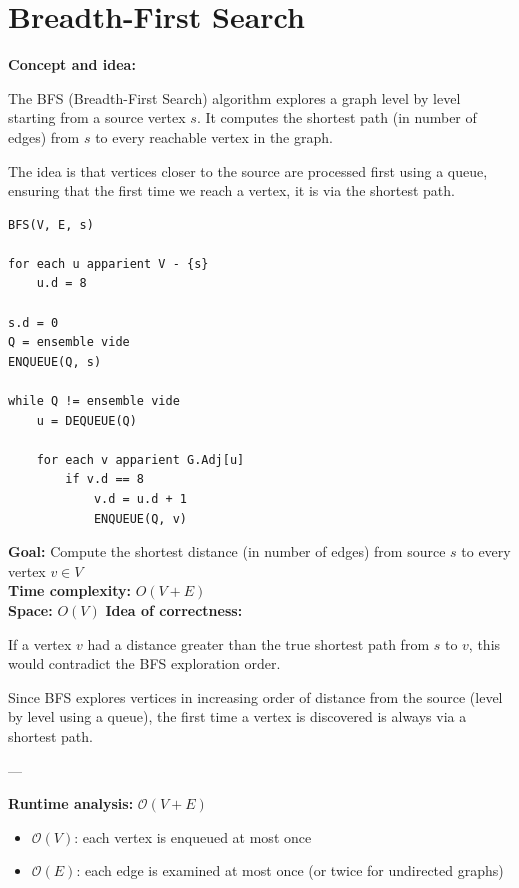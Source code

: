 \documentclass[11pt,a4paper,openany]{book}
\begin{document}
\vspace{2cm}





\section{Breadth-First Search}
\textbf{Concept and idea:}

The BFS (Breadth-First Search) algorithm explores a graph level by level starting from a source vertex $s$.  
It computes the shortest path (in number of edges) from $s$ to every reachable vertex in the graph.

The idea is that vertices closer to the source are processed first using a queue, ensuring that the first time we reach a vertex, it is via the shortest path.

\begin{lstlisting}
BFS(V, E, s)

for each u apparient V - {s}
    u.d = 8

s.d = 0
Q = ensemble vide
ENQUEUE(Q, s)

while Q != ensemble vide
    u = DEQUEUE(Q)

    for each v apparient G.Adj[u]
        if v.d == 8
            v.d = u.d + 1
            ENQUEUE(Q, v)
\end{lstlisting}

\textbf{Goal:} Compute the shortest distance (in number of edges) from source $s$ to every vertex $v \in V$ \\

\textbf{Time complexity:} $O(V + E)$ \\

\textbf{Space:} $O(V)$
\textbf{Idea of correctness:}

If a vertex $v$ had a distance greater than the true shortest path from $s$ to $v$, this would contradict the BFS exploration order.

Since BFS explores vertices in increasing order of distance from the source (level by level using a queue), the first time a vertex is discovered is always via a shortest path.

---

\textbf{Runtime analysis:} $\mathcal{O}(V + E)$

\begin{itemize}
    \item $\mathcal{O}(V)$: each vertex is enqueued at most once
    \item $\mathcal{O}(E)$: each edge is examined at most once (or twice for undirected graphs)
\end{itemize}
\end{document}
